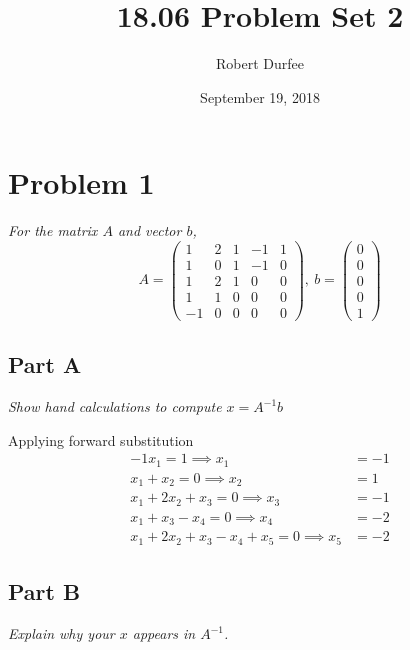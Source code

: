 \documentclass{article}
\title{18.06 Problem Set 2}
\author{Robert Durfee}
\date{September 19, 2018}
\begin{document}
\maketitle

\section*{Problem 1}

\textit{For the matrix $ A $ and vector $ b $,}
\[
    A = \begin{pmatrix}
        1 & 2 & 1 & -1 & 1 \\
        1 & 0 & 1 & -1 & 0 \\
        1 & 2 & 1 & 0 & 0 \\
        1 & 1 & 0 & 0 & 0 \\
        -1 & 0 & 0 & 0 & 0
    \end{pmatrix},
    \ b = \begin{pmatrix}
        0 \\
        0 \\
        0 \\
        0 \\
        1
    \end{pmatrix}
\]

\subsection*{Part A}

\textit{Show hand calculations to compute $ x = A^{-1} b $}

\bigbreak

Applying forward substitution
\begin{align*}
    -1 x_1 = 1 \implies x_1 &= -1 \\
     x_1 + x_2 = 0 \implies x_2 &= 1 \\
     x_1 + 2 x_2 + x_3 = 0 \implies x_3 &= -1 \\
     x_1 + x_3 - x_4 = 0 \implies x_4 &= -2 \\
     x_1 + 2 x_2 + x_3 - x_4 + x_5 = 0 \implies x_5 &= -2
\end{align*}

\subsection*{Part B}

\textit{Explain why your $ x $ appears in $ A^{-1} $.}

\bigbreak
\end{document}
